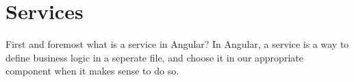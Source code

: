 \section{ Services }
\maketitle{}

First and foremost what is a service in Angular? In Angular, a service is a way
to define business logic in a seperate file, and choose it in our appropriate 
component when it makes sense to do so. 
